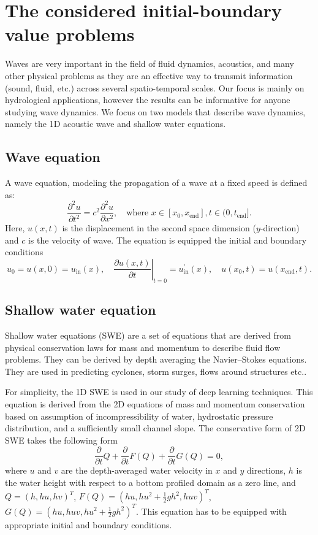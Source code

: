\section{The considered initial-boundary value problems}
Waves are very important in the field of fluid dynamics,
acoustics, and many other physical problems as they are an effective way to transmit information (sound, fluid, etc.) across several spatio-temporal scales. 
Our focus is mainly on hydrological applications, however the results can be informative for anyone studying wave dynamics. We focus on two models that describe wave dynamics, namely the 1D acoustic wave and shallow water equations. 
 
\subsection{Wave equation}

A wave equation, modeling the propagation of a wave at a fixed speed is defined as:
\begin{equation}
\label{eq:wave}
\frac{\partial^2u}{\partial t^2} = c^2 \frac{\partial^2u}{\partial x^2},\quad \mbox{where } x \in [x_0, x_{\mathrm{end}}], t \in (0, t_{\mathrm{end}}].
\end{equation}
Here, $u(x, t)$ is the displacement in the second space dimension ($y$-direction) and $c$ is the velocity of wave. The equation is equipped the initial and boundary conditions
\begin{equation}
\label{eq:wave_cond}
u_0 = u(x,0) = u_{\mathrm{in}}(x), \quad
\left.\frac{\partial u(x, t)}{\partial t} \right|_{t=0} = u^{\prime}_{\mathrm{in}}(x), \quad 
u(x_0, t) = u(x_{\mathrm{end}}, t). 
\end{equation}

\subsection{Shallow water equation}

Shallow water equations (SWE) are a set of equations that are derived from physical conservation laws for mass and momentum to describe fluid flow problems. They can be derived by depth averaging 
the Navier--Stokes equations. They are used in predicting cyclones, storm surges, flows around structures etc..

For simplicity, the 1D SWE is used in our study of deep learning techniques. 
This equation is derived from the 2D equations of mass and momentum conservation based on assumption
of incompressibility of water, hydrostatic pressure distribution, and a sufficiently small channel slope. 
The conservative form of 2D SWE takes the following form   
\[
\frac{\partial}{\partial t}Q + \frac{\partial }{\partial t} F(Q) + \frac{\partial }{\partial t} G(Q) = 0,
\]
where $u$ and $v$ are the depth-averaged water velocity in $x$ and $y$ directions, $h$ is the water height 
with respect to a bottom profiled domain as a zero line, and 
$Q = (h, hu, hv)^T$, $F(Q) = (hu, hu^2+ \frac{1}{2}gh^2, huv)^T$, $G(Q) =(hu, huv, hu^2+ \frac{1}{2}gh^2)^T$.
This equation has to be equipped with appropriate initial and boundary conditions. 


